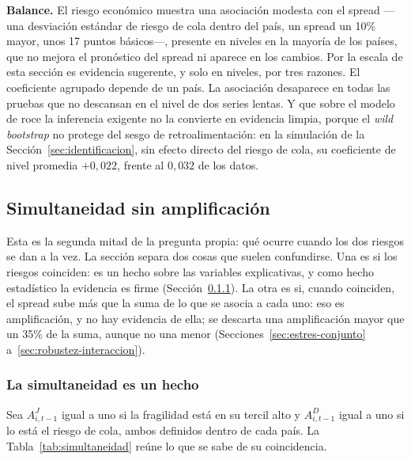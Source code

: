 \textbf{Balance.} El riesgo económico muestra una asociación modesta con el spread ---una desviación estándar de riesgo de cola dentro del país, un spread un 10\% mayor, unos 17 puntos básicos---, presente en niveles en la mayoría de los países, que no mejora el pronóstico del spread ni aparece en los cambios. Por la escala de esta sección es evidencia sugerente, y solo en niveles, por tres razones. El coeficiente agrupado depende de un país. La asociación desaparece en todas las pruebas que no descansan en el nivel de dos series lentas. Y que sobre el modelo de \citet{Chari2024b} roce la inferencia exigente no la convierte en evidencia limpia, porque el \textit{wild bootstrap} no protege del sesgo de retroalimentación: en la simulación de la Sección~\ref{sec:identificacion}, sin efecto directo del riesgo de cola, su coeficiente de nivel promedia $+0{,}022$, frente al $0{,}032$ de los datos.

\subsection{Simultaneidad sin amplificación}
\label{sec:aditivos}

Esta es la segunda mitad de la pregunta propia: qué ocurre cuando los dos riesgos se dan a la vez. La sección separa dos cosas que suelen confundirse. Una es si los riesgos coinciden: es un hecho sobre las variables explicativas, y como hecho estadístico la evidencia es firme (Sección~\ref{sec:simultaneidad}). La otra es si, cuando coinciden, el spread sube más que la suma de lo que se asocia a cada uno: eso es amplificación, y no hay evidencia de ella; se descarta una amplificación mayor que un 35\% de la suma, aunque no una menor (Secciones~\ref{sec:estres-conjunto} a~\ref{sec:robustez-interaccion}).

\subsubsection{La simultaneidad es un hecho}
\label{sec:simultaneidad}

Sea $A^{J}_{i,t-1}$ igual a uno si la fragilidad está en su tercil alto y $A^{D}_{i,t-1}$ igual a uno si lo está el riesgo de cola, ambos definidos dentro de cada país. La Tabla~\ref{tab:simultaneidad} reúne lo que se sabe de su coincidencia.

